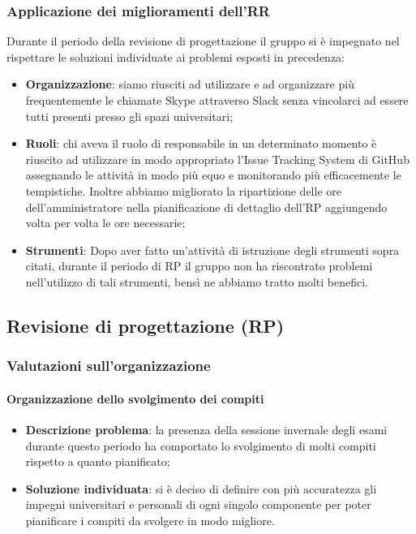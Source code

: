 		\subsubsection{Applicazione dei miglioramenti dell'RR}
			Durante il periodo della revisione di progettazione il gruppo si è impegnato nel rispettare le soluzioni individuate ai problemi esposti in precedenza:
			\begin{itemize}
				\item \textbf{Organizzazione}: siamo riusciti ad utilizzare e ad organizzare più frequentemente le chiamate Skype attraverso Slack senza vincolarci ad essere tutti presenti presso gli spazi universitari;
				\item \textbf{Ruoli}: chi aveva il ruolo di responsabile in un determinato momento è riuscito ad utilizzare in modo appropriato l'Issue Tracking System di GitHub assegnando le attività in modo più equo e monitorando più efficacemente le tempistiche. Inoltre abbiamo migliorato la ripartizione delle ore dell'amministratore nella pianificazione di dettaglio dell'RP aggiungendo volta per volta le ore necessarie;
				\item \textbf{Strumenti}: Dopo aver fatto un'attività di istruzione degli strumenti sopra citati, durante il periodo di RP il gruppo non ha riscontrato problemi nell'utilizzo di tali strumenti, bensì ne abbiamo tratto molti benefici.
			\end{itemize}
	\subsection{Revisione di progettazione (RP)}
		\subsubsection{Valutazioni sull'organizzazione}
			\paragraph{Organizzazione dello svolgimento dei compiti}
				\begin{itemize}
					\item \textbf{Descrizione problema}: la presenza della sessione invernale degli esami durante questo periodo ha comportato lo svolgimento di molti compiti rispetto a quanto pianificato;
					\item \textbf{Soluzione individuata}: si è deciso di definire con più accuratezza gli impegni universitari e personali di ogni singolo componente per poter pianificare i compiti da svolgere in modo migliore.
				\end{itemize}
